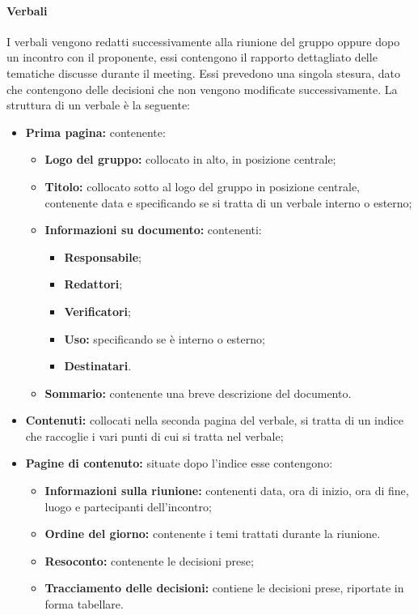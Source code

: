\paragraph{Verbali}
I verbali vengono redatti successivamente alla riunione del gruppo oppure dopo un incontro con il proponente, essi contengono il rapporto dettagliato delle tematiche discusse durante il meeting. 
Essi prevedono una singola stesura, dato che contengono delle decisioni che non vengono modificate successivamente.
La struttura di un verbale è la seguente:
\begin {itemize}
    \item \textbf{Prima pagina:} contenente:
    \begin{itemize}
        \item \textbf{Logo del gruppo:} collocato in alto, in posizione centrale;
        \item \textbf{Titolo:} collocato sotto al logo del gruppo in posizione centrale, contenente data e specificando se si tratta di un verbale interno o esterno;
        \item \textbf{Informazioni su documento:} contenenti:
        \begin{itemize}
            \item \textbf{Responsabile};
            \item \textbf{Redattori};
            \item \textbf{Verificatori};
            \item \textbf{Uso:} specificando se è interno o esterno;
            \item \textbf{Destinatari}.
        \end{itemize}
        \item \textbf{Sommario:} contenente una breve descrizione del documento.
    \end {itemize}
    \item \textbf{Contenuti:} collocati nella seconda pagina del verbale, si tratta di un indice che raccoglie i vari punti di cui si tratta nel verbale;
    \item \textbf{Pagine di contenuto:} situate dopo l'indice esse contengono:
    \begin {itemize}
        \item \textbf{Informazioni sulla riunione:} contenenti data, ora di inizio, ora di fine, luogo e partecipanti dell'incontro;
        \item \textbf{Ordine del giorno:} contenente i temi trattati durante la riunione.
        \item \textbf{Resoconto:} contenente le decisioni prese;
        \item \textbf{Tracciamento delle decisioni:} contiene le decisioni prese, riportate in forma tabellare.
    \end {itemize}
\end {itemize}
